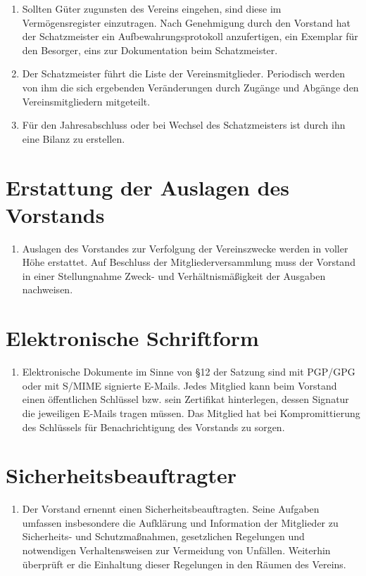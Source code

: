 \documentclass[fontsize=12pt,paper=a4,pagesize]{scrartcl}
\begin{document}
\begin{enumerate}
    \item Sollten Güter zugunsten des Vereins eingehen, sind diese im
        Vermögensregister einzutragen. Nach Genehmigung durch den Vorstand hat
        der Schatzmeister ein Aufbewahrungsprotokoll anzufertigen, ein Exemplar
        für den Besorger, eins zur Dokumentation beim Schatzmeister.

    \item Der Schatzmeister führt die Liste der Vereinsmitglieder.
        Periodisch werden von ihm die sich ergebenden Veränderungen durch
        Zugänge und Abgänge den Vereinsmitgliedern mitgeteilt.

    \item Für den Jahresabschluss oder bei Wechsel des Schatzmeisters ist
        durch ihn eine Bilanz zu erstellen.

\end{enumerate}

\section{Erstattung der Auslagen des Vorstands}

\begin{enumerate}
    \item Auslagen des Vorstandes zur Verfolgung der Vereinszwecke werden
        in voller Höhe erstattet. Auf Beschluss der Mitgliederversammlung
        muss der Vorstand in einer Stellungnahme Zweck- und
        Verhältnismäßigkeit der Ausgaben nachweisen.
\end{enumerate}

\section{Elektronische Schriftform}

\begin{enumerate}
    \item Elektronische Dokumente im Sinne von §12 der Satzung sind mit
        PGP/GPG oder mit S/MIME signierte E-Mails. Jedes Mitglied kann beim
        Vorstand einen öffentlichen Schlüssel bzw. sein Zertifikat
        hinterlegen, dessen Signatur die jeweiligen E-Mails tragen müssen.
        Das Mitglied hat bei Kompromittierung des Schlüssels für
        Benachrichtigung des Vorstands zu sorgen.
\end{enumerate}


\section{Sicherheitsbeauftragter}

\begin{enumerate}
    \item Der Vorstand ernennt einen Sicherheitsbeauftragten. Seine
        Aufgaben umfassen insbesondere die Aufklärung und Information der
        Mitglieder zu Sicherheits- und Schutzmaßnahmen, gesetzlichen
        Regelungen und notwendigen Verhaltensweisen zur Vermeidung von
        Unfällen. Weiterhin überprüft er die Einhaltung dieser Regelungen in
        den Räumen des Vereins.
\end{enumerate}
\end{document}
